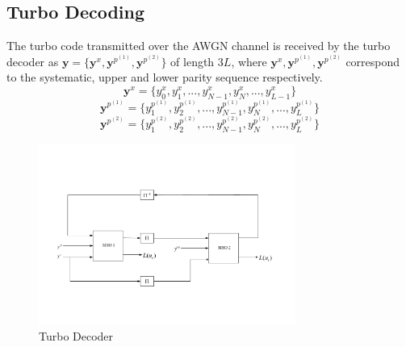 \documentclass[20 pts]{article}
\begin{document}
 
 \subsection{Turbo Decoding}
 The turbo code transmitted over the AWGN channel is received by the turbo decoder as
  $\mathbf{y}=\{\mathbf{y}^x,\mathbf{y}^{p^{(1)}},\mathbf{y}^{p^{(2)}}\}$ 
  of length $3L$, where $\mathbf{y}^x,\mathbf{y}^{p^{(1)}},\mathbf{y}^{p^{(2)}}$
    correspond to the systematic, upper and lower parity sequence respectively.
    $$\mathbf{y}^x=\{y^x_0, y^x_1,...,y^x_{N-1}, y^x_N ,...,y^x_{L-1}\}$$ 
    $$\mathbf{y}^{p^{(1)}}=\{y^{p^{(1)}}_1, y^{p^{(1)}}_2,...,y^{p^{(1)}}_{N-1}, 
    y^{p^{(1)}}_N ,...,y^{p^{(1)}}_{L}\}$$
 $$\mathbf{y}^{p^{(2)}}=\{y^{p^{(2)}}_1, y^{p^{(2)}}_2,...,y^{p^{(2)}}_{N-1}, 
    y^{p^{(2)}}_N ,...,y^{p^{(2)}}_{L}\}$$
\begin{figure}[h!]
\centering
		\includegraphics[width=0.75\textwidth]{D1.pdf}
		\caption{Turbo Decoder}
		\label{TDC}
		\end{figure}
	
\end{document}
